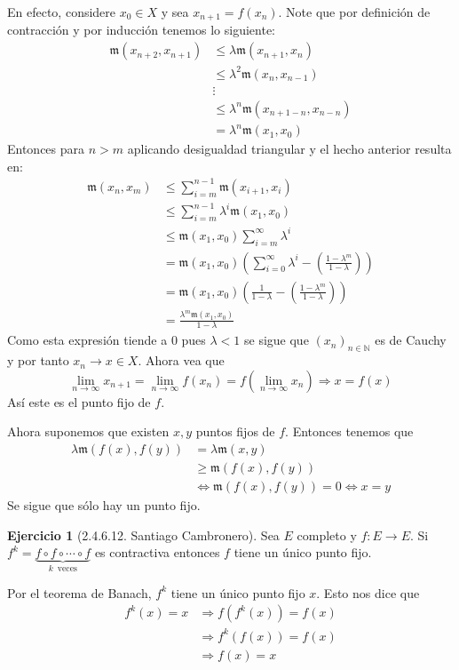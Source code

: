 \documentclass[12pt]{article}
\theoremstyle{plain}
\theoremstyle{definition}
\newtheorem{Ej}[Th]{Ejercicio}
\theoremstyle{remark}
\numberwithin{equation}{section}
\newcommand{\la}{\lambda}           %
\newcommand{\bN}{\mathbb{N}}        %
\newcommand{\mm}{\mathfrak{m}}      %
\renewcommand{\geq}{\geqslant}      %
\renewcommand{\leq}{\leqslant}      %
\renewcommand{\:}{\colon}           %
\begin{document}
\begin{multicols}{2}
\begin{ptcbp}
En efecto, considere $x_0\in X$ y sea $x_{n+1}=f(x_n)$. Note que por definición de contracción y por inducción tenemos lo siguiente:
\begin{align*}
   \mm(x_{n+2},x_{n+1})&\leq \la\mm(x_{n+1},x_n)  \\
   &\leq \la^2\mm(x_{n},x_{n-1})  \\
   &\vdots  \\
   &\leq \la^n\mm(x_{n+1-n},x_{n-n})  \\
   &=\la^n\mm(x_1,x_0)
\end{align*}
Entonces para $n>m$ aplicando desigualdad triangular y el hecho anterior resulta en:
\begin{align*}
  \mm(x_n,x_m) &\leq\sum_{i=m}^{n-1}\mm(x_{i+1},x_i)  \\
   &\leq\sum_{i=m}^{n-1}\la^i\mm(x_{1},x_0)   \\
   &\leq\mm(x_1,x_0)\sum_{i=m}^{\infty}\la^i \\
   &=\mm(x_1,x_0)\left(\sum_{i=0}^{\infty}\la^i-\left(\frac{1-\la^m}{1-\la}\right)\right) \\
   &=\mm(x_1,x_0)\left(\frac{1}{1-\la}-\left(\frac{1-\la^m}{1-\la}\right)\right) \\
   &=\frac{\la^m\mm(x_1,x_0)}{1-\la}
\end{align*}
Como esta expresión tiende a $0$ pues $\la<1$ se sigue que $(x_n)_{n\in\bN}$ es de Cauchy y por tanto $x_n\to x\in X$. Ahora vea que
$$\lim_{n\to\infty}x_{n+1}=\lim_{n\to\infty}f(x_n)=f(\lim_{n\to\infty}x_{n})\Rightarrow x=f(x)$$
Así este es el punto fijo de $f$. \par
Ahora suponemos que existen $x,y$ puntos fijos de $f$. Entonces tenemos que
\begin{align*}
  \la\mm(f(x),f(y)) &=\la\mm(x,y)  \\
   &\geq\mm(f(x),f(y)) \\
   &\iff\mm(f(x),f(y))=0\iff x=y
\end{align*}
Se sigue que sólo hay un punto fijo.
\end{ptcbp}

 \begin{Ej}[2.4.6.12. Santiago Cambronero]
   Sea $E$ completo y $f\colon E\to E$. Si $f^k=\underbrace{f\circ f\circ\cdots\circ f}_{k\,\text{ veces}}$ es contractiva entonces $f$ tiene un único punto fijo.
 \end{Ej}

 \begin{ptcb}
Por el teorema de Banach, $f^k$ tiene un único punto fijo $x$. Esto nos dice que
\begin{align*}
  f^k(x)=x &\Rightarrow f(f^k(x))=f(x)  \\
   &\Rightarrow f^k(f(x))=f(x)  \\
   & \Rightarrow f(x)=x
\end{align*}


\end{ptcb}
\end{multicols}
\end{document}
